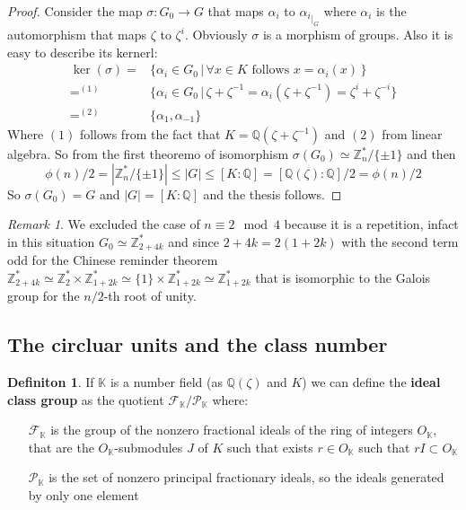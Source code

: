 \documentclass[]{article}
\theoremstyle{plain}
\theoremstyle{remark}
\newtheorem{rem}{Remark}
\theoremstyle{definition}
\newtheorem{deff}[teo]{Definiton}
\newcommand{\Z}{\mathbb{Z}}
\newcommand{\K}{\mathbb{K}}
\newcommand{\Q}{\mathbb{Q}}
\DeclareMathOperator*{\eqb }{=}
\begin{document}
	\begin{proof}
		Consider the map $ \sigma : G_0 \to G $ that maps $ \alpha_i $ to $ {\alpha_i }_{|_{G}} $ where $ \alpha_i $ is the automorphism that maps $ \zeta $ to $ \zeta ^i $. Obviously $\sigma$ is a morphism of groups.
		Also it is easy to describe its kernerl:
		\begin{align*}
			\ker (\sigma) =	& \{ \alpha_i \in G_0 \,|\, \forall x \in K \text{ follows } x = \alpha_i(x)  \, \}\\
							 \eqb ^{(1)}	& \{ \alpha_i \in G_0 \,|\,  \zeta + \zeta^{-1} = \alpha_i (\zeta + \zeta^{-1}) = \zeta^i  + \zeta ^{-i}\} \\
							 \eqb^{(2)}& \{ \alpha_1 , \alpha_{-1}\}
		\end{align*}
		Where $ (1) $ follows from the fact that $ K = \Q (\zeta + \zeta ^{-1}) $ and $ (2) $ from linear algebra. %
		So from the first theoremo of isomorphism $ \sigma(G_0) \simeq  \Z_{n}^*/ \{\pm 1\}  $ and then 
		\begin{equation*}
			\phi(n)/2 = | \Z_{n}^*/ \{\pm 1\}| \leq |G| \leq [K : \Q] = [\Q( \zeta) : \Q ]/ 2 = \phi(n)/2
		\end{equation*}
		So $  \sigma(G_0) = G $ and $ |G| = [K : \Q] $ and the thesis follows. 
	\end{proof}
	
	\begin{rem}
		We excluded the case of $ n \equiv 2 \mod 4 $ because it is a repetition, infact in this situation $ G_0 \simeq \Z_{2 + 4k}^* $ and since $ 2+ 4k = 2 (1+2k) $ with the second term odd for the Chinese reminder theorem $ \Z_{2 + 4k}^* \simeq \Z_2^* \times \Z_{1 + 2k}^* \simeq \{1\} \times \Z_{1 + 2k}^* \simeq \Z_{1 + 2k}^* $ that is isomorphic to the Galois group for the $ n/2 $-th root of unity.  
	\end{rem}



	\subsection{The circluar units and the class number}

	\begin{deff}
		If $ \K $ is a number field (as $ \Q (\zeta) $ and $ K $)  we can define the \textbf{ideal class group} as the quotient $ \mathcal{F}_\K / \mathcal{P}_\K $ where:
	\begin{itemize}
		\item[$ \mathcal{F}_\K $] is the group of the nonzero fractional ideals of the ring of integers  $ O_\K $, that are the $ O_\K  $-submodules $ J $ of $ K $ such that exists $ r \in O_\K  $ such that $ r I \subset O_\K  $
		\item[$ \mathcal{P}_\K $] is the set of nonzero principal fractionary ideals, so the ideals generated by only one element
	\end{itemize}
	\end{deff}
\end{document}
